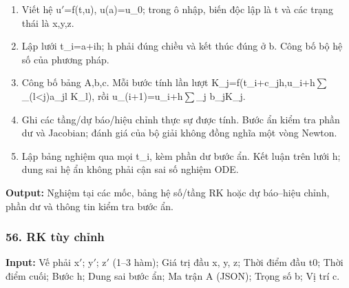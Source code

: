 \begin{enumerate}

\item Viết hệ u\ensuremath{\prime}=\allowbreak{}f(\allowbreak{}t,\allowbreak{}u),\allowbreak{} u(\allowbreak{}a)=\allowbreak{}u\_0;\allowbreak{} trong ô nhập,\allowbreak{} biến độc lập là t và các trạng thái là x,\allowbreak{}y,\allowbreak{}z.

\item Lập lưới t\_i=\allowbreak{}a+\allowbreak{}ih;\allowbreak{} h phải đúng chiều và kết thúc đúng ở b. Công bố bộ hệ số của phương pháp.

\item Công bố bảng A,\allowbreak{}b,\allowbreak{}c. Mỗi bước tính lần lượt K\_j=\allowbreak{}f(\allowbreak{}t\_i+\allowbreak{}c\_jh,\allowbreak{}u\_i+\allowbreak{}h\ensuremath{\sum}\_(\allowbreak{}l<j)a\_jl K\_l),\allowbreak{} rồi u\_(\allowbreak{}i+\allowbreak{}1)=\allowbreak{}u\_i+\allowbreak{}h\ensuremath{\sum}\_j b\_jK\_j.

\item Ghi các tầng/\allowbreak{}dự báo/\allowbreak{}hiệu chỉnh thực sự được tính. Bước ẩn kiểm tra phần dư và Jacobian;\allowbreak{} đánh giá của bộ giải không đồng nghĩa một vòng Newton.

\item Lập bảng nghiệm qua mọi t\_i,\allowbreak{} kèm phần dư bước ẩn. Kết luận trên lưới h;\allowbreak{} dung sai hệ ẩn không phải cận sai số nghiệm ODE.

\end{enumerate}

\textbf{Output:} Nghiệm tại các mốc,\allowbreak{} bảng hệ số/\allowbreak{}tầng RK hoặc dự báo–hiệu chỉnh,\allowbreak{} phần dư và thông tin kiểm tra bước ẩn.

\examplebreak\subsubsection*{56. RK tùy chỉnh}

\textbf{Input:} Vế phải x\ensuremath{\prime};\allowbreak{} y\ensuremath{\prime};\allowbreak{} z\ensuremath{\prime} (\allowbreak{}1–3 hàm);\allowbreak{} Giá trị đầu x,\allowbreak{} y,\allowbreak{} z;\allowbreak{} Thời điểm đầu t0;\allowbreak{} Thời điểm cuối;\allowbreak{} Bước h;\allowbreak{} Dung sai bước ẩn;\allowbreak{} Ma trận A (\allowbreak{}JSON);\allowbreak{} Trọng số b;\allowbreak{} Vị trí c.

